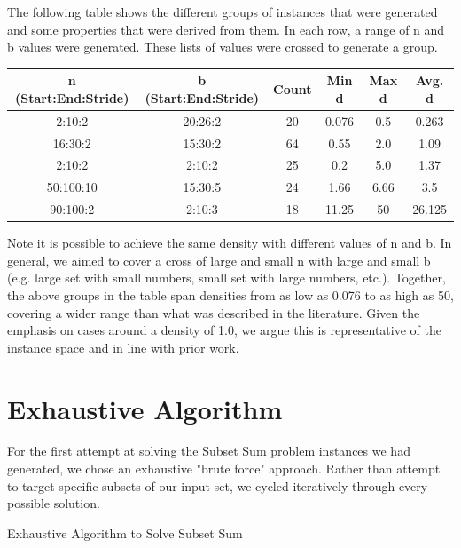 \documentclass{report}
\begin{document}
The following table shows the different groups of instances that were generated
and some properties that were derived from them. In each row, a range of n and
b values were generated. These lists of values were crossed to generate
a group.
\begin{center}
  \begin{tabular}{| c | c | c | c | c | c |}
    \hline
    n (Start:End:Stride) & b (Start:End:Stride) & Count & Min d & Max d & Avg. d \\
    \hline
    2:10:2 & 20:26:2 & 20 & 0.076 & 0.5 & 0.263 \\
    \hline
    16:30:2 & 15:30:2 & 64 & 0.55 & 2.0 & 1.09 \\    
    \hline
    2:10:2 & 2:10:2 & 25 & 0.2 & 5.0 & 1.37 \\
    \hline
    50:100:10 & 15:30:5 & 24 & 1.66 & 6.66 & 3.5 \\    
    \hline
    90:100:2 & 2:10:3 & 18 & 11.25 & 50 & 26.125 \\    
    \hline
  \end{tabular}
\end{center}
Note it is possible to achieve the same density with different values of n and b.
In general, we aimed to cover a cross of large and small n with large and small b
(e.g. large set with small numbers, small set with large numbers, etc.). Together,
the above groups in the table span densities from as low as 0.076 to as high as 50,
covering a wider range than what was described in the literature. Given the emphasis
on cases around a density of 1.0, we argue this is representative of the instance
space and in line with prior work.

\chapter{Exhaustive Algorithm}
For the first attempt at solving the Subset Sum problem instances we had generated, we
chose an exhaustive "brute force" approach. Rather than attempt to target specific
subsets of our input set, we cycled iteratively through every possible solution.

\begin{algorithm}
  \caption{Exhaustive Algorithm to Solve Subset Sum}
  \label{exhaustive}
  \begin{algorithmic}
    \ENDFOR
    \ENDIF
    \ENDFOR
  \end{algorithmic}
\end{algorithm}
\end{document}
